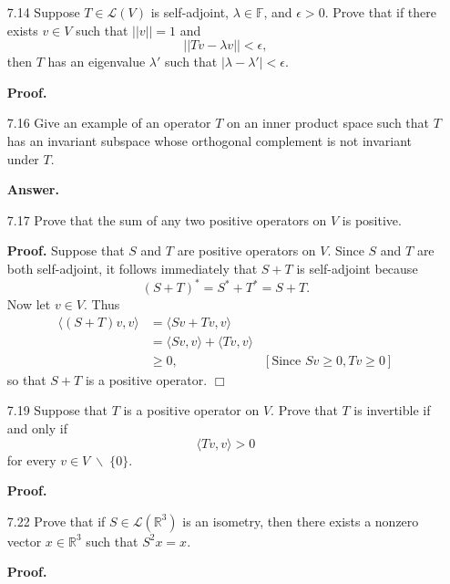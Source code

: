 \documentclass[9pt]{article}
\newcommand{\qed}{\hfill \ensuremath{\Box}}
\newcommand{\F}{\mathbb{F}}
\newcommand{\R}{\mathbb{R}}
\newcommand{\cyc}[1]{\langle #1 \rangle}
\begin{document}
\begin{enumerate}
   \item[7.14] Suppose $T \in \mathcal{L}(V)$ is self-adjoint, $\lambda \in \F$,
               and $\epsilon > 0$. Prove that if there exists $v \in V$ such
               that $||v|| = 1$ and
               $$||Tv - \lambda v|| < \epsilon,$$
               then $T$ has an eigenvalue $\lambda'$ such that
               $|\lambda - \lambda'| < \epsilon$.
               
      \textbf{Proof.}
   \item[7.16] Give an example of an operator $T$ on an inner product space such
               that $T$ has an invariant subspace whose orthogonal complement is
               not invariant under $T$.

      \textbf{Answer.}
   \item[7.17] Prove that the sum of any two positive operators on $V$ is
               positive.

      \textbf{Proof.} Suppose that $S$ and $T$ are positive operators on $V$.
      Since $S$ and $T$ are both self-adjoint, it follows immediately that
      $S + T$ is self-adjoint because
      $$(S+T)^* = S^*+T^* = S + T.$$
      Now let $v \in V$. Thus
      \begin{align*}
         \cyc{(S+T)v,v} &= \cyc{Sv + Tv, v} \\
            &= \cyc{Sv, v} + \cyc{Tv, v} \\
            &\ge 0, &[\text{Since } Sv \ge 0, Tv \ge 0]
      \end{align*}
      so that $S + T$ is a positive operator. \qed
   \item[7.19] Suppose that $T$ is a positive operator on $V$. Prove that $T$ is
               invertible if and only if
               $$\cyc{Tv, v} > 0$$
               for every $v \in V\;\backslash\;\{0\}$.

      \textbf{Proof.}
      
   \item[7.22] Prove that if $S \in \mathcal{L}(\R^3)$ is an isometry, then
               there exists a nonzero vector $x \in \R^3$ such that $S^2x = x$.

      \textbf{Proof.} 
\end{enumerate}
\end{document}
